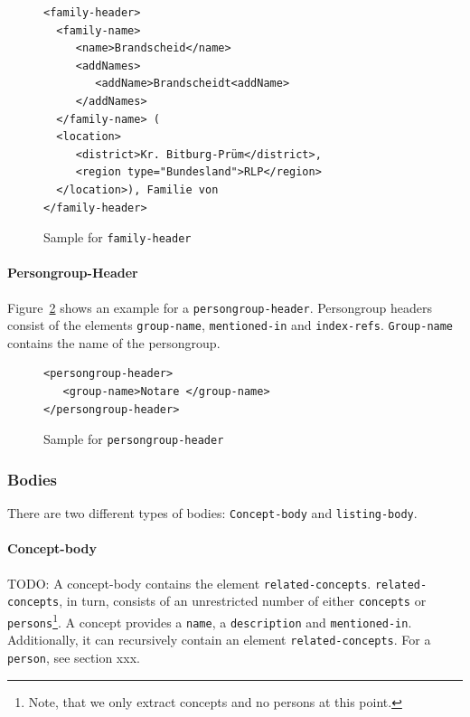 \begin{figure}[H]
\centering
\begin{verbatim}
<family-header>
  <family-name>
     <name>Brandscheid</name>
     <addNames>
        <addName>Brandscheidt<addName>       
     </addNames>
  </family-name> (
  <location>
     <district>Kr. Bitburg-Prüm</district>, 
     <region type="Bundesland">RLP</region>
  </location>), Familie von 
</family-header>
\end{verbatim}
\caption{Sample for \texttt{family-header}}
\label{fig:family-header-xml}
\end{figure}

\paragraph{Persongroup-Header}
Figure~\ref{fig:persongroup-header-xml} shows an example for a \texttt{persongroup-header}. Persongroup headers consist of the elements \texttt{group-name}, \texttt{mentioned-in} and \texttt{index-refs}. \texttt{Group-name} contains the name of the persongroup.

\begin{figure}[H]
\centering
\begin{verbatim}
<persongroup-header>
   <group-name>Notare </group-name>
</persongroup-header>
\end{verbatim}
\caption{Sample for \texttt{persongroup-header}}
\label{fig:persongroup-header-xml}
\end{figure}

\subsubsection{Bodies}
There are two different types of bodies: \texttt{Concept-body} and \texttt{listing-body}.

\paragraph{Concept-body}
TODO: A concept-body contains the element \texttt{related-concepts}. \texttt{related-concepts}, in turn, consists of an unrestricted number of either \texttt{concepts} or \texttt{persons}\footnote{Note, that we only extract concepts and no persons at this point.}. A concept provides a \texttt{name}, a \texttt{description} and \texttt{mentioned-in}. Additionally, it can recursively contain an element \texttt{related-concepts}. For a \texttt{person}, see section xxx.


